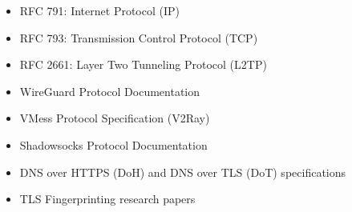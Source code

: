 \begin{itemize}
    \item RFC 791: Internet Protocol (IP)
    \item RFC 793: Transmission Control Protocol (TCP)
    \item RFC 2661: Layer Two Tunneling Protocol (L2TP)
    \item WireGuard Protocol Documentation
    \item VMess Protocol Specification (V2Ray)
    \item Shadowsocks Protocol Documentation
    \item DNS over HTTPS (DoH) and DNS over TLS (DoT) specifications
    \item TLS Fingerprinting research papers
\end{itemize}

